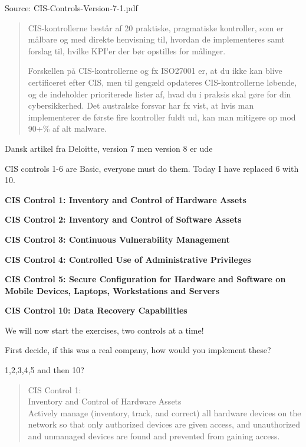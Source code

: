 \documentclass[Screen16to9,17pt]{foils}
\begin{document}
Source:  CIS-Controls-Version-7-1.pdf



\begin{quote}
CIS-kontrollerne består af 20 praktiske, pragmatiske kontroller, som er målbare og med direkte henvisning til, hvordan de implementeres samt forslag til, hvilke KPI’er der bør opstilles for målinger.

Forskellen på CIS-kontrollerne og fx ISO27001 er, at du ikke kan blive certificeret efter CIS, men til gengæld opdateres CIS-kontrollerne løbende, og de indeholder prioriterede lister af, hvad du i praksis skal gøre for din cybersikkerhed. Det australske forsvar har fx vist, at hvis man implementerer de første fire kontroller fuldt ud, kan man mitigere op mod 90+\% af alt malware.
\end{quote}

Dansk artikel fra Deloitte, version 7 men version 8 er ude



CIS controls 1-6 are Basic, everyone must do them. Today I have replaced 6 with 10.

\begin{list2}
\item {\bf CIS Control 1: Inventory and Control of Hardware Assets}
\item {\bf CIS Control 2: Inventory and Control of Software Assets}
\item {\bf CIS Control 3: Continuous Vulnerability Management}
\item {\bf  CIS Control 4: Controlled Use of Administrative Privileges}
\item {\bf CIS Control 5:
Secure Configuration for Hardware and Software on Mobile Devices, Laptops, Workstations and Servers}
\item {\bf CIS Control 10: Data Recovery Capabilities}
\end{list2}

We will now start the exercises, two controls at a time!

First decide, if this was a real company, how would you implement these?

1,2,3,4,5 and then 10?


\begin{quote}
CIS Control 1:\\
Inventory and Control of Hardware Assets\\
Actively manage (inventory, track, and correct) all hardware devices on the network so that only authorized devices are given access, and unauthorized and unmanaged devices are found and prevented from gaining access.
\end{quote}
\end{document}
